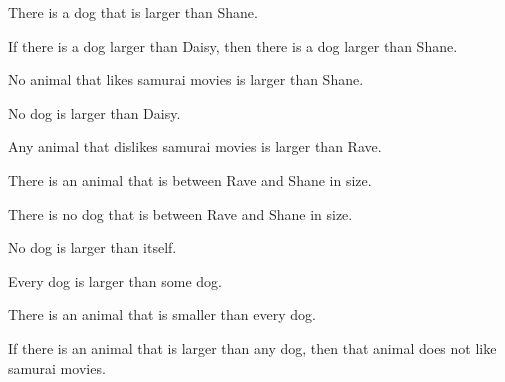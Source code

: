 \begin{practiceproblems}
\begin{problemslist}
				\item There is a dog that is larger than Shane.
				\item[] 
				\item If there is a dog larger than Daisy, then there is a dog larger than Shane.
				\item[] 
				\item No animal that likes samurai movies is larger than Shane.
				\item[] 
				\item No dog is larger than Daisy.
				\item[] 
				\item Any animal that dislikes samurai movies is larger than Rave.
				\item[] 
				\item There is an animal that is between Rave and Shane in size.
				\item[] 
				\item There is no dog that is between Rave and Shane in size.
				\item[] 
				\item No dog is larger than itself.
				\item[] 
				\item Every dog is larger than some dog.
				\item[] 
				\item There is an animal that is smaller than every dog.
				\item[] 
				\item If there is an animal that is larger than any dog, then that animal does not like samurai movies.
				\item[] 
			\end{problemslist}
			

\end{practiceproblems}
